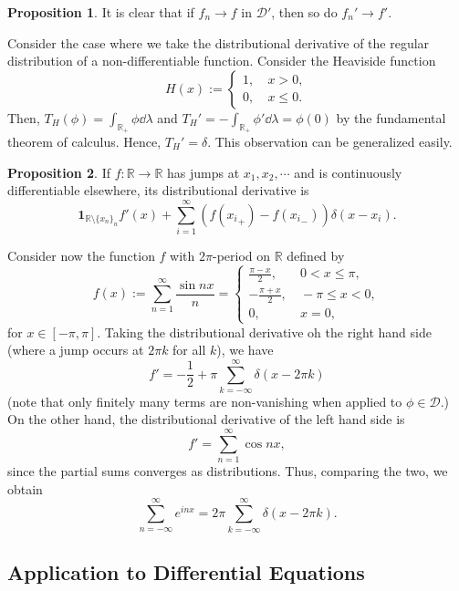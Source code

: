 \documentclass[]{article}
\theoremstyle{definition}
\theoremstyle{definition}
\newtheorem{proposition}{Proposition}[section]
\begin{document}
\begin{proposition}
  It is clear that if \(f_n \to f\) in \(\mathcal{D}'\), then so do \(f_n' \to f'\).
\end{proposition}

Consider the case where we take the distributional derivative of the regular 
distribution of a non-differentiable function. Consider the Heaviside function 
\[H(x) := \begin{cases}
  1, & \ x > 0,\\
  0, & \ x \le 0.
\end{cases}\]
Then, \(T_H(\phi) = \int_{\mathbb{R}_+} \phi \dd \lambda\) and 
\(T_H' = -  \int_{\mathbb{R}_+} \phi' \dd \lambda = \phi(0)\) by the fundamental 
theorem of calculus. Hence, \(T_H' = \delta\). This observation can be generalized 
easily. 

\begin{proposition}
  If \(f : \mathbb{R} \to \mathbb{R}\) has jumps at \(x_1, x_2, \cdots\) and 
  is continuously differentiable elsewhere, its distributional derivative is 
  \[\mathbf{1}_{\mathbb{R} \setminus \{x_n\}_n}
    f'(x) + \sum_{i = 1}^\infty (f({x_i}_+) - f({x_i}_-))\delta(x - x_i).\]
\end{proposition}

Consider now the function \(f\) with \(2\pi\)-period on \(\mathbb{R}\) defined by 
\[f(x) := \sum_{n = 1}^\infty \frac{\sin nx}{n} = 
  \begin{cases}
    \frac{\pi - x}{2}, & \ 0 < x \le \pi,\\
    -\frac{\pi + x}{2}, & \ -\pi \le x < 0,\\
    0, & \ x = 0,
  \end{cases}\]
for \(x \in [-\pi, \pi]\). Taking the distributional derivative oh the right hand 
side (where a jump occurs at \(2\pi k\) for all \(k\)), we have 
\[f' = - \frac{1}{2} + \pi\sum_{k = -\infty}^\infty \delta(x - 2\pi k)\]
(note that only finitely many terms are non-vanishing when applied to 
\(\phi \in \mathcal{D}\).) On the other hand, the distributional derivative 
of the left hand side is 
\[f' = \sum_{n = 1}^\infty \cos nx,\]
since the partial sums converges as distributions. Thus, comparing the 
two, we obtain 
\[\sum_{n = -\infty}^\infty e^{inx} = 2\pi \sum_{k = -\infty}^\infty \delta(x - 2\pi k).\]

\subsection{Application to Differential Equations}
\end{document}
